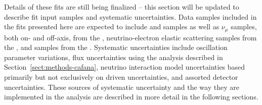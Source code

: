 Details of these fits are still being finalized -- this section will be updated to describe fit input samples and systematic uncertainties. Data samples included in the  fits presented here are expected to include  \numutonumu and \numutonue samples as well as $\nu_\mu$  samples, both on- and off-axis, from the  , neutrino-electron elastic scattering samples from the  , and samples from the  . Systematic uncertainties include oscillation parameter variations, flux uncertainties using the  analysis described in Section~\ref{sect:methods-cafana}, neutrino interaction model uncertainties based primarily but not exclusively on  driven uncertainties, and assorted detector uncertainties. These sources of systematic uncertainty and the way they are implemented in the analysis are described in more detail in the following sections.
